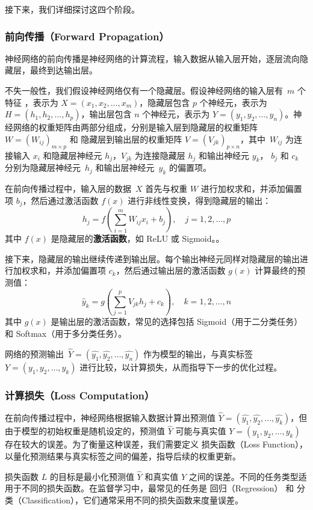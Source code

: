 接下来，我们详细探讨这四个阶段。

\subsubsection*{前向传播（Forward Propagation）}
神经网络的前向传播是神经网络的计算流程，输入数据从输入层开始，逐层流向隐藏层，最终到达输出层。

不失一般性，我们假设神经网络仅有一个隐藏层。假设神经网络的输入层有~$m$ 个特征 ，表示为 $X = (x_1, x_2, \dots, x_m)$，隐藏层包含 $p$ 个神经元，表示为 $H = (h_1, h_2, \dots, h_p)$，输出层包含 $n$ 个神经元，表示为 $Y = (y_1, y_2, \dots, y_n)$。神经网络的权重矩阵由两部分组成，分别是输入层到隐藏层的权重矩阵 $W = (W_{ij})_{m\times p}$  和 隐藏层到输出层的权重矩阵 $V = (V_{jk})_{p\times n}$，其中~$ W_{ij} $ 为连接输入 $ x_i $ 和隐藏层神经元 $ h_j $，$ V_{jk} $ 为连接隐藏层 $ h_j $ 和输出神经元 $ y_k $， $b_j$ 和 $c_k$ 分别为隐藏层神经元~$h_j$ 和输出层神经元~$y_k$ 的偏置项。

在前向传播过程中，输入层的数据~$X$ 首先与权重 $W$ 进行加权求和，并添加偏置项 $b_j$，然后通过激活函数 $f(x)$ 进行非线性变换，得到隐藏层的输出：
$$ h_j = f\left( \sum_{i=1}^m W_{ij} x_i +b_j \right), \quad j=1,2,\dots, p$$
其中 $ f(x) $ 是隐藏层的{\bf 激活函数}，如 ReLU 或 Sigmoid。。

接下来，隐藏层的输出继续传递到输出层。每个输出神经元同样对隐藏层的输出进行加权求和，并添加偏置项 $c_k$，然后通过输出层的激活函数 $g(x)$ 计算最终的预测值：
$$ \hat y_k = g\left( \sum_{j=1}^p V_{jk} h_j +c_k \right), \quad k=1,2,\dots, n$$
其中 $ g(x) $ 是输出层的激活函数，常见的选择包括 Sigmoid（用于二分类任务）和 Softmax（用于多分类任务）。

网络的预测输出~$\hat Y= ( \hat{y_1},\hat{y_2},\dots,\hat{y_n} )$ 作为模型的输出，与真实标签 $Y = (y_1, y_2, \dots, y_k)$ 进行比较，以计算损失，从而指导下一步的优化过程。

\subsubsection*{计算损失（Loss Computation）}

在前向传播过程中，神经网络根据输入数据计算出预测值 $\hat{Y} = (\hat{y_1}, \hat{y_2}, \dots, \hat{y_k})$，但由于模型的初始权重是随机设定的，预测值 $\hat{Y}$ 可能与真实值 $Y = (y_1, y_2, \dots, y_k)$ 存在较大的误差。为了衡量这种误差，我们需要定义 损失函数（Loss Function），以量化预测结果与真实标签之间的偏差，指导后续的权重更新。

损失函数 $L$ 的目标是最小化预测值 $\hat{Y}$ 和真实值 $Y$ 之间的误差。不同的任务类型适用于不同的损失函数。在监督学习中，最常见的任务是 回归（Regression） 和 分类（Classification），它们通常采用不同的损失函数来度量误差。

